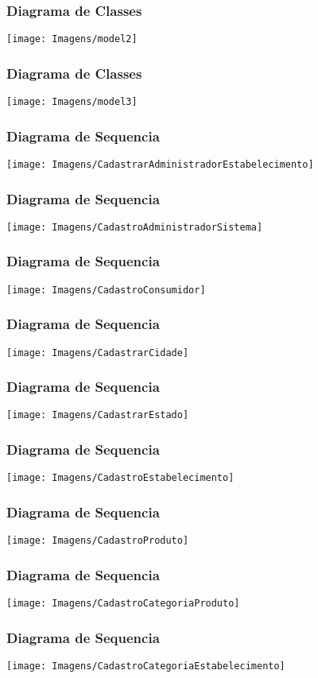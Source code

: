 \begin{frame}
	\frametitle{Diagrama de Classes}
	\texttt{[image: Imagens/model2]}
\end{frame}


\begin{frame}
	\frametitle{Diagrama de Classes}
	\texttt{[image: Imagens/model3]}
\end{frame}

\begin{frame}
	\frametitle{Diagrama de Sequencia}
	\texttt{[image: Imagens/CadastrarAdministradorEstabelecimento]}
\end{frame}

\begin{frame}
	\frametitle{Diagrama de Sequencia}
	\texttt{[image: Imagens/CadastroAdministradorSistema]}
\end{frame}

\begin{frame}
	\frametitle{Diagrama de Sequencia}
	\texttt{[image: Imagens/CadastroConsumidor]}
\end{frame}

\begin{frame}
	\frametitle{Diagrama de Sequencia}
	\texttt{[image: Imagens/CadastrarCidade]}
\end{frame}

\begin{frame}
	\frametitle{Diagrama de Sequencia}
	\texttt{[image: Imagens/CadastrarEstado]}
\end{frame}

\begin{frame}
	\frametitle{Diagrama de Sequencia}
	\texttt{[image: Imagens/CadastroEstabelecimento]}
\end{frame}

\begin{frame}
	\frametitle{Diagrama de Sequencia}
	\texttt{[image: Imagens/CadastroProduto]}
\end{frame}

\begin{frame}
	\frametitle{Diagrama de Sequencia}
	\texttt{[image: Imagens/CadastroCategoriaProduto]}
\end{frame}

\begin{frame}
	\frametitle{Diagrama de Sequencia}
	\texttt{[image: Imagens/CadastroCategoriaEstabelecimento]}
\end{frame}

